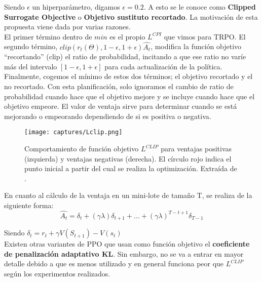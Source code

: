 \documentclass[11pt,fleqn]{book} %
\begin{document}
Siendo $\epsilon$ un hiperparámetro, digamos $\epsilon=0.2$. A esto se le conoce como \textbf{Clipped Surrogate Objective} o \textbf{Objetivo sustituto recortado}. La motivación de esta propuesta viene dada por varias razones.\\

El primer término dentro de $min$ es el propio $L^{CPI}$ que vimos para TRPO. El segundo término, $clip(r_t(\Theta),1-\epsilon,1+\epsilon)\hat{A_t}$, modifica la función objetivo ``recortando'' (clip) el ratio de probabilidad, incitando a que ese ratio no varíe más del intervalo $[1-\epsilon,1+\epsilon]$ para cada actualización de la política. \\

Finalmente, cogemos el mínimo de estos dos términos; el objetivo recortado y el no recortado. Con esta planificación, solo ignoramos el cambio de ratio de probabilidad cuando hace que el objetivo mejore y se incluye cuando hace que el objetivo empeore. El valor de ventaja sirve para determinar cuando se está mejorando o empeorando dependiendo de si es positiva o negativa. \\

\begin{figure}[H]
	\centering\texttt{[image: captures/Lclip.png]}
	\caption{Comportamiento de función objetivo $L^{CLIP}$ para ventajas positivas (izquierda) y ventajas negativas (derecha). El círculo rojo indica el punto inicial a partir del cual se realiza la optimización. Extraída de \cite{article:PPO2}.}
	\label{fig:Lclip} %
\end{figure}

En cuanto al cálculo de la ventaja en un mini-lote de tamaño T, se realiza de la siguiente forma: \\

\begin{equation}
\hat{A_t}=\delta_t+(\gamma\lambda)\delta_{t+1}+...+(\gamma\lambda)^{T-t+1}\delta_{T-1}
\end{equation}

Siendo $\delta_t=r_t+\gamma V(S_{t+1})-V(s_t)$ \\

Existen otras variantes de PPO que usan como función objetivo el \textbf{coeficiente de penalización adaptativo KL}. Sin embargo, no se va a entrar en mayor detalle debido a que es menos utilizado y en general funciona peor que $L^{CLIP}$ según los experimentos realizados.\\
\end{document}
